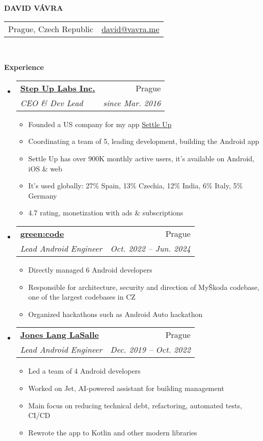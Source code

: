 \documentclass[letterpaper,11pt]{article}
\makeatletter
\newcommand{\resitem}[1]{\item #1 \vspace{-2pt}}
\newcommand{\resheading}[1]{{\large \colorbox{mygrey}{\begin{minipage}{\textwidth}{\textbf{#1 \vphantom{p\^{E}}}}\end{minipage}}}}
\newcommand{\ressubheading}[4]{
\begin{tabular*}{6.5in}{l@{\extracolsep{\fill}}r}
		\textbf{#1} & #2 \\
		\textit{#3} & \textit{#4} \\
\end{tabular*}\vspace{-6pt}}
\makeatother
\begin{document}
\newcommand{\myheader}{
\begin{center}
\textbf{\Huge DAVID VÁVRA}
\end{center} 
\begin{tabular*}{7in}{l@{\extracolsep{\fill}}r}
	Prague, Czech Republic &  \href{mailto:david@vavra.me}{david@vavra.me} \\
	\end{tabular*}
\\
\vspace{0.1in}}

\myheader



\resheading{Experience}
	\begin{itemize}
	\item 
			\ressubheading{\href{https://stepuplabs.io}{Step Up Labs Inc.}}{Prague}{CEO \& Dev Lead}{since Mar. 2016}
				{ \footnotesize
				\begin{itemize}
					\resitem{Founded a US company for my app \href{settleup.io}{Settle Up}}
					\resitem{Coordinating a team of 5, leading development, building the Android app}
					\resitem{Settle Up has over 900K monthly active users, it's available on Android, iOS \& web}
					\resitem{It's used globally: 27\% Spain, 13\% Czechia, 12\% India, 6\% Italy, 5\% Germany}
					\resitem{4.7 rating, monetization with ads \& subscriptions}
				\end{itemize}
				}	    
	\item 
			\ressubheading{\href{https://www.greencode.cz/}{green:code}}{Prague}{Lead Android Engineer}{Oct. 2022 -- Jun. 2024}
				{ \footnotesize
				\begin{itemize}
					\resitem{Directly managed 6 Android developers}
					\resitem{Responsible for architecture, security and direction of MyŠkoda codebase, one of the largest codebases in CZ}
					\resitem{Organized hackathons such as Android Auto hackathon}
				\end{itemize}
				}	                
	\item 
			\ressubheading{\href{https://www.us.jll.com/}{Jones Lang LaSalle}}{Prague}{Lead Android Engineer}{Dec. 2019 -- Oct. 2022}
				{ \footnotesize
				\begin{itemize}
					\resitem{Led a team of 4 Android developers}
					\resitem{Worked on Jet, AI-powered assistant for building management}
					\resitem{Main focus on reducing technical debt, refactoring, automated tests, CI/CD}
					\resitem{Rewrote the app to Kotlin and other modern libraries}
				\end{itemize}
				}	


\end{itemize}
\end{document}
